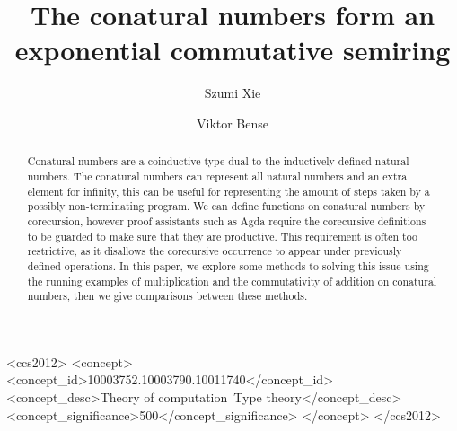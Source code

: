 \documentclass[sigplan, screen, natbib=false, review]{acmart}
\begin{document}
\title{The conatural numbers form an exponential commutative semiring}

\author{Szumi Xie}

\author{Viktor Bense}


\begin{abstract}
  Conatural numbers are a coinductive type dual to the inductively defined
  natural numbers. The conatural numbers can represent all natural numbers and
  an extra element for infinity, this can be useful for representing the amount
  of steps taken by a possibly non-terminating program. We can define functions
  on conatural numbers by corecursion, however proof assistants such as Agda
  require the corecursive definitions to be guarded to make sure that they are
  productive. This requirement is often too restrictive, as it disallows the
  corecursive occurrence to appear under previously defined operations. In this
  paper, we explore some methods to solving this issue using the running
  examples of multiplication and the commutativity of addition on conatural
  numbers, then we give comparisons between these methods.

\end{abstract}

\begin{CCSXML}
  <ccs2012>
  <concept>
  <concept_id>10003752.10003790.10011740</concept_id>
  <concept_desc>Theory of computation~Type theory</concept_desc>
  <concept_significance>500</concept_significance>
  </concept>
  </ccs2012>
\end{CCSXML}
\end{document}
